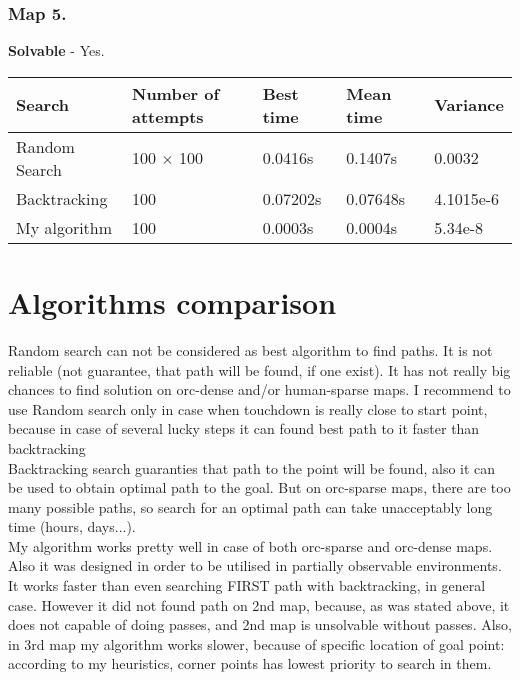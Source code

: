 \documentclass[a4paper,12pt]{article}
\begin{document}
    \subsubsection*{Map 5.}
    
    \textbf{Solvable} - Yes.\\
    \begin{center}
        \begin{tabular}{|l|l|l|l|l|}
            \hline
            Search & Number of attempts & Best time & Mean time & Variance\\
            \hline
            Random Search & 100 $\times$ 100 & 0.0416s & 0.1407s & 0.0032\\
            \hline
            Backtracking & 100 & 0.07202s & 0.07648s & 4.1015e-6\\
            \hline
            My algorithm & 100 & 0.0003s & 0.0004s &  5.34e-8\\
            \hline
        \end{tabular}
    \end{center}
    \section{Algorithms comparison}
    Random search can not be considered as best algorithm to find paths. It is not
    reliable (not guarantee, that path will be found, if one exist). It has not 
    really big chances to find solution on orc-dense and/or human-sparse maps.
    I recommend to use Random search only in case when touchdown is really close 
    to start point, because in case of several lucky steps it can found best path
    to it faster than backtracking\\
    Backtracking search guaranties that path to the point will be found, also it
    can be used to obtain optimal path to the goal. But on orc-sparse maps, there
    are too many possible paths, so search for an optimal path can take unacceptably 
    long time (hours, days...). \\
    My algorithm works pretty well in case of both orc-sparse and orc-dense maps.
    Also it was designed in order to be utilised in partially observable environments.
    It works faster than even searching FIRST path with backtracking, in general case.
    However it did not found path on 2nd map, because, as was stated above, it 
    does not capable of doing passes, and 2nd map is unsolvable without passes.
    Also, in 3rd map my algorithm works slower, because of specific location of
    goal point: according to my heuristics, corner points has lowest priority to
    search in them.\\
\end{document}
